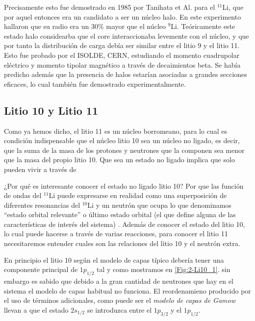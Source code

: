 Precisamente esto fue demostrado en 1985 por Tanihata et Al. para el $^{11}$Li, que por aquel entonces era un candidato a ser un núcleo halo. En este experimento hallaron que su radio era un 30\% mayor que el núcleo $^{9}$Li. Teóricamente este estado halo considearba que el core interaccionaba levemente con el núcleo, y que por tanto la distribución de carga debía ser similar entre el litio 9 y el litio 11. Esto fue probado por el ISOLDE, CERN, estudiando el momento cuadrupolar eléctrico \cite{ARNOLD199216} y momento tipolar magnético \cite{Arnold:180144} a través de decaimientos beta. Se había predicho además que la presencia de halos estarían asociadas a grandes secciones eficaces, lo cual también fue demostrado experimentalmente. 


\subsection{Litio 10 y Litio 11}

Como ya hemos dicho, el litio 11 es un núcleo borromeano, para lo cual es condición indispensable que el núcleo litio 10 sea un núcleo no ligado, es decir, que la suma de la masa de los protones y neutrones que la componen sea menor que la masa del propio litio 10. Que sea un estado no ligado implica que solo pueden vivir a través de 

¿Por qué es interesante conocer el estado no ligado litio 10? Por que las función de ondas del $^{11}$Li puede expresarse en realidad como una superposición de diferentes resonancias del $^{10}$Li y un neutrón que ocupa lo que denominamos ``estado orbital relevante'' o último estado orbital (el que define alguna de las características de interés del sistema) \cite{SANETULLAEV2016481}. Además de conocer el estado del litio 10, lo cual puede hacerse a través de varias reacciones, para conocer el litio 11 necesitaremos entender cuales son las relaciones del litio 10 y el neutrón extra.

En principio el litio 10 según el modelo de capas típico debería tener una componente principal de $1p_{1/2}$ tal y como mostramos en \cref{Fig:2-Li10_1}. sin embargo es sabido que debido a la gran cantidad de neutrones que hay en el sistema el modelo de capas habitual no funciona. El reordenamieno producido por el uso de términos adicionales, como puede ser el \textit{modelo de capas de Gamow} llevan a que el estado $2s_{1/2}$ se introduzca entre el $1p_{3/2}$  y el $1p_{1/2}$. 

